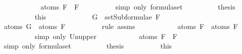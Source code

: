 \begin{isabellebody}
\ \ \ \ \ \ \isamarkupfalse%
\ \isamarkupfalse%
\ {\isachardoublequoteopen}{\isasymdots}\ {\isacharequal}\ atoms\ {\isacharparenleft}F{}\ \isactrlbold {\isasymor}\ F{}{\isacharparenright}{\isachardoublequoteclose}\isanewline
\ \ \ \ \ \ \ \ \isamarkupfalse%
\ {\isacharparenleft}simp\ only{\isacharcolon}\ formula{\isachardot}set{\isacharparenleft}{}{\isacharparenright}{\isacharparenright}\isanewline
\ \ \ \ \ \ \isamarkupfalse%
\ \isamarkupfalse%
\ {\isacharquery}thesis\isanewline
\ \ \ \ \ \ \ \ \isamarkupfalse%
\ this\isanewline
\ \ \ \ \isamarkupfalse%
\isanewline
\ \ \ \ \ \ \isamarkupfalse%
\ {\isachardoublequoteopen}G\ {\isasymin}\ setSubformulae\ F{}{\isachardoublequoteclose}\isanewline
\ \ \ \ \ \ \isamarkupfalse%
\ \isamarkupfalse%
\ {\isachardoublequoteopen}atoms\ G\ {\isasymsubseteq}\ atoms\ F{}{\isachardoublequoteclose}\isanewline
\ \ \ \ \ \ \ \ \isamarkupfalse%
\ {\isacharparenleft}rule\ assms{\isacharparenleft}{}{\isacharparenright}{\isacharparenright}\isanewline
\ \ \ \ \ \ \isamarkupfalse%
\ \isamarkupfalse%
\ {\isachardoublequoteopen}{\isasymdots}\ {\isasymsubseteq}\ atoms\ F{}\ {\isasymunion}\ atoms\ F{}{\isachardoublequoteclose}\isanewline
\ \ \ \ \ \ \ \ \isamarkupfalse%
\ {\isacharparenleft}simp\ only{\isacharcolon}\ Un{\isacharunderscore}upper{}{\isacharparenright}\isanewline
\ \ \ \ \ \ \isamarkupfalse%
\ \isamarkupfalse%
\ {\isachardoublequoteopen}{\isasymdots}\ {\isacharequal}\ atoms\ {\isacharparenleft}F{}\ \isactrlbold {\isasymor}\ F{}{\isacharparenright}{\isachardoublequoteclose}\isanewline
\ \ \ \ \ \ \ \ \isamarkupfalse%
\ {\isacharparenleft}simp\ only{\isacharcolon}\ formula{\isachardot}set{\isacharparenleft}{}{\isacharparenright}{\isacharparenright}\isanewline
\ \ \ \ \ \ \isamarkupfalse%
\ \isamarkupfalse%
\ {\isacharquery}thesis\isanewline
\ \ \ \ \ \ \ \ \isamarkupfalse%
\ this\isanewline
\ \ \ \ \isamarkupfalse%
\isanewline
\ \ \isamarkupfalse%
\isanewline
{}\isamarkupfalse%
%
\endisatagproof
{\isafoldproof}%
%
\isadelimproof
\isanewline
%
\endisadelimproof
\isanewline
{}\isamarkupfalse%

\end{isabellebody}
